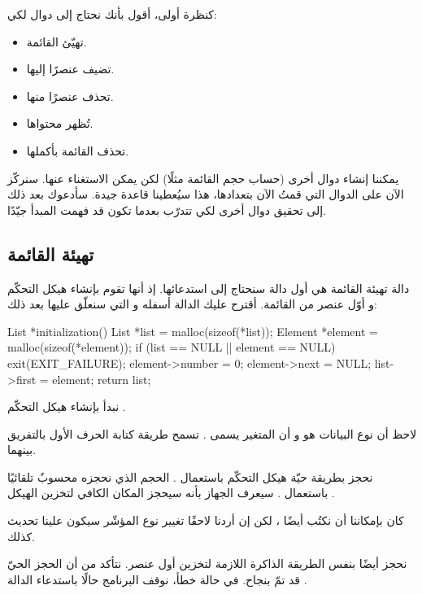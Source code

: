 كنظرة أولى، أقول بأنك نحتاج إلى دوال لكي:

\begin{itemize}
	\item تهيّئ القائمة.
	\item تضيف عنصرًا إليها.
	\item تحذف عنصرًا منها.
	\item تُظهر محتواها.
	\item تحذف القائمة بأكملها.
\end{itemize}

يمكننا إنشاء دوال أخرى (حساب حجم القائمة مثلًا) لكن يمكن الاستغناء عنها. سنركّز الآن على الدوال التي قمتُ الآن بتعدادها، هذا سيُعطينا قاعدة جيدة. سأدعوك بعد ذلك إلى تحقيق دوال أخرى لكي تتدرّب بعدما تكون قد فهمت المبدأ جيّدًا.

\subsection{تهيئة القائمة}

دالة تهيئة القائمة هي أول دالة سنحتاج إلى استدعائها. إذ أنها تقوم بإنشاء هيكل التحكّم و أوّل عنصر من القائمة. أقترح عليك الدالة أسفله و التي سنعلّق عليها بعد ذلك:

\begin{Csource}
List *initialization()
{
	List *list = malloc(sizeof(*list));
	Element *element = malloc(sizeof(*element));
	if (list == NULL || element == NULL)
	{
		exit(EXIT_FAILURE);
	}
	element->number = 0;
	element->next = NULL;
	list->first = element;
	return list;
}
\end{Csource}

نبدأ بإنشاء هيكل التحكّم 
.

\begin{information}
لاحظ أن نوع البيانات هو
و أن المتغير يسمى
.
تسمح طريقة كتابة الحرف الأول بالتفريق بينهما.
\end{information}

نحجز بطريقة حيّة هيكل التحكّم باستعمال 
.
الحجم الذي نحجزه محسوبٌ تلقائيًا باستعمال
.
سيعرف الجهاز بأنه سيحجز المكان الكافي لتخزين الهيكل
.

\begin{information}
 كان بإمكاننا أن نكتُب أيضًا
،
لكن إن أردنا لاحقًا تغيير نوع المؤشّر
سيكون علينا تحديث 
كذلك.
\end{information}

نحجز أيضًا بنفس الطريقة الذاكرة اللازمة لتخزين أول عنصر. نتأكد من أن الحجز الحيّ قد تمّ بنجاح. في حالة خطأ، نوقف البرنامج حالًا باستدعاء الدالة
.

